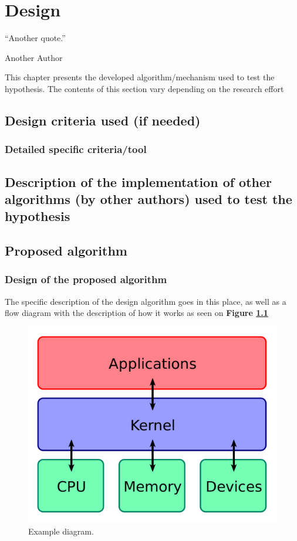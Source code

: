 \chapter{Design}
\epigraph{``Another quote.''}{\vspace{10pt}Another Author}
\label{chapter:design}
\newpage

This chapter presents the developed algorithm/mechanism used to test the hypothesis. The contents of this section vary depending on the research effort
\section{Design criteria used (if needed)}

\subsection{Detailed specific criteria/tool}

\section{Description of the implementation of other algorithms (by other authors) used to test the hypothesis}

\section{Proposed algorithm}

\subsection{Design of the proposed algorithm}
The  specific description of the design algorithm goes in this place, as well as a flow diagram with the description of how it works as seen on \textbf{Figure \ref{fig:proposedalgorithm} }

\begin{figure}
	\begin{center}
		\includegraphics[width=1\columnwidth]{../img/image.png}
		\caption{Example diagram.}
		\label{fig:proposedalgorithm}
	\end{center}
\end{figure} 


